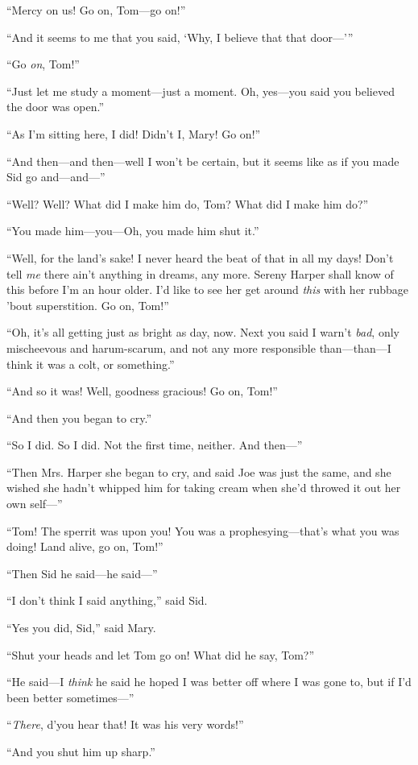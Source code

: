 \documentclass{book}
\begin{document}
“Mercy on us! Go on, Tom—go on!”

“And it seems to me that you said, ‘Why, I believe that that door—’”

“Go \emph{on}, Tom!”

“Just let me study a moment—just a moment. Oh, yes—you said you believed the door was open.”

“As I’m sitting here, I did! Didn’t I, Mary! Go on!”

“And then—and then—well I won’t be certain, but it seems like as if you made Sid go and—and—”

“Well? Well? What did I make him do, Tom? What did I make him do?”

“You made him—you—Oh, you made him shut it.”

“Well, for the land’s sake! I never heard the beat of that in all my days! Don’t tell \emph{me} there ain’t anything in dreams, any more. Sereny Harper shall know of this before I’m an hour older. I’d like to see her get around \emph{this} with her rubbage ’bout superstition. Go on, Tom!”

“Oh, it’s all getting just as bright as day, now. Next you said I warn’t \emph{bad}, only mischeevous and harum-scarum, and not any more responsible than—than—I think it was a colt, or something.”

“And so it was! Well, goodness gracious! Go on, Tom!”

“And then you began to cry.”

“So I did. So I did. Not the first time, neither. And then—”

“Then Mrs. Harper she began to cry, and said Joe was just the same, and she wished she hadn’t whipped him for taking cream when she’d throwed it out her own self—”

“Tom! The sperrit was upon you! You was a prophesying—that’s what you was doing! Land alive, go on, Tom!”

“Then Sid he said—he said—”

“I don’t think I said anything,” said Sid.

“Yes you did, Sid,” said Mary.

“Shut your heads and let Tom go on! What did he say, Tom?”

“He said—I \emph{think} he said he hoped I was better off where I was gone to, but if I’d been better sometimes—”

“\emph{There}, d’you hear that! It was his very words!”

“And you shut him up sharp.”
\end{document}
